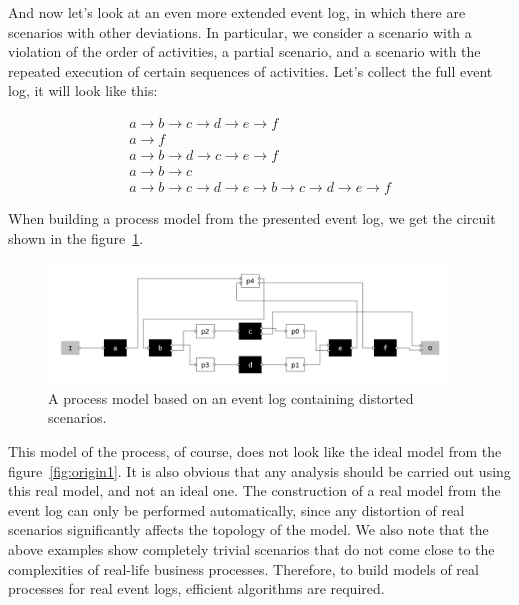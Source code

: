 \documentclass[
11pt,%
tightenlines,%
twoside,%
onecolumn,%
nofloats,%
nobibnotes,%
nofootinbib,%
superscriptaddress,%
noshowpacs,%
centertags]%
{revtex4}
\begin{document}
And now let's look at an even more extended event log, in which there are scenarios with other deviations.
In particular, we consider a scenario with a violation of the order of activities, a partial scenario, and a scenario with the repeated execution of certain sequences of activities.
Let's collect the full event log, it will look like this:

\begin{eqnarray*}
a \rightarrow b \rightarrow c \rightarrow d \rightarrow e \rightarrow f \\
a \rightarrow f \\
a \rightarrow b \rightarrow d \rightarrow c \rightarrow e \rightarrow f \\
a \rightarrow b \rightarrow c \\
a \rightarrow b \rightarrow c \rightarrow d \rightarrow e \rightarrow b \rightarrow c \rightarrow d \rightarrow e \rightarrow f
\end{eqnarray*}

When building a process model from the presented event log, we get the circuit shown in the figure~\ref{fig:third1}.

\begin{figure}[h]
\setcaptionmargin{5mm}
\includegraphics[width=0.95\textwidth]{pics/third1.png}
\caption{A process model based on an event log containing distorted scenarios.}
\label{fig:third1}
\end{figure}

This model of the process, of course, does not look like the ideal model from the figure~\ref{fig:origin1}.
It is also obvious that any analysis should be carried out using this real model, and not an ideal one.
The construction of a real model from the event log can only be performed automatically, since any distortion of real scenarios significantly affects the topology of the model.
We also note that the above examples show completely trivial scenarios that do not come close to the complexities of real-life business processes.
Therefore, to build models of real processes for real event logs, efficient algorithms are required.
\end{document}
